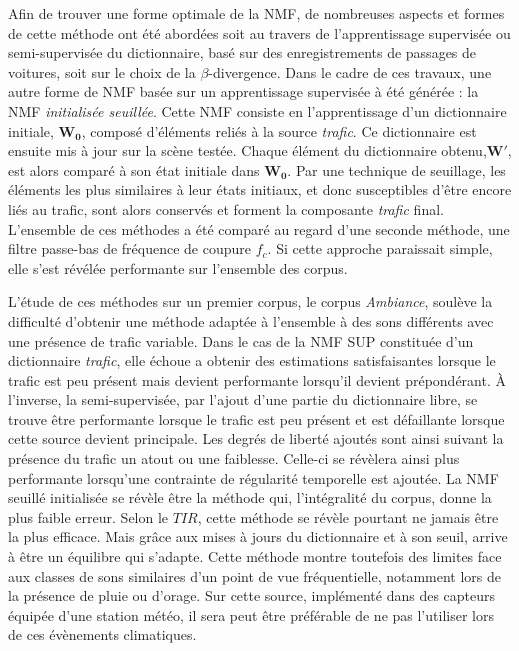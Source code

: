 Afin de trouver une forme optimale de la NMF, de nombreuses aspects et formes de cette méthode ont été abordées soit au travers de l'apprentissage supervisée ou semi-supervisée du dictionnaire, basé sur des enregistrements de passages de voitures, soit sur le choix de la $\beta$-divergence. Dans le cadre de ces travaux, une autre forme de NMF basée sur un apprentissage supervisée à été générée : la NMF \textit{initialisée seuillée}. Cette NMF consiste en l'apprentissage d'un dictionnaire initiale, $\mathbf{W_0}$, composé d'éléments reliés à la source \textit{trafic}. Ce dictionnaire est ensuite mis à jour sur la scène testée. Chaque élément du dictionnaire obtenu,$\mathbf{W'}$, est alors comparé à son état initiale dans $\mathbf{W_0}$. Par une technique de seuillage, les éléments les plus similaires à leur états initiaux, et donc susceptibles d'être encore liés au trafic, sont alors conservés et forment la composante \textit{trafic} final.
L'ensemble de ces méthodes a été comparé au regard d'une seconde méthode, une filtre passe-bas de fréquence de coupure $f_c$. Si cette approche paraissait simple, elle s'est révélée performante sur l'ensemble des corpus.

L'étude de ces méthodes sur un premier corpus, le corpus \textit{Ambiance}, soulève la difficulté d'obtenir une méthode adaptée à l'ensemble à des sons différents avec une présence de trafic variable. Dans le cas de la NMF SUP constituée d'un dictionnaire \textit{trafic}, elle échoue a obtenir des estimations satisfaisantes lorsque le trafic est peu présent mais devient performante lorsqu'il devient prépondérant. À l'inverse, la semi-supervisée, par l'ajout d'une partie du dictionnaire libre, se trouve être performante lorsque le trafic est peu présent et est défaillante lorsque cette source devient principale. Les degrés de liberté ajoutés sont ainsi suivant la présence du trafic un atout ou une faiblesse. Celle-ci se révèlera ainsi plus performante lorsqu'une contrainte de régularité temporelle est ajoutée. 
La NMF seuillé initialisée se révèle être la méthode qui, l'intégralité du corpus, donne la plus faible erreur. Selon le $TIR$, cette méthode se révèle pourtant ne jamais être la plus efficace. Mais grâce aux mises à jours du dictionnaire et à son seuil, arrive à être un équilibre qui s'adapte. Cette méthode montre toutefois des limites face aux classes de sons similaires d'un point de vue fréquentielle, notamment lors de la présence de pluie ou d'orage. Sur cette source, implémenté dans des capteurs équipée d'une station météo, il sera peut être préférable de ne pas l'utiliser lors de ces évènements climatiques.

